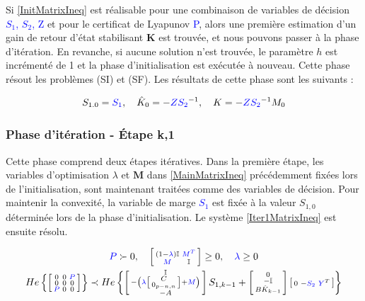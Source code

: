 Si \eqref{InitMatrixIneq} est réalisable pour une combinaison de variables de décision \textcolor{blue}{$S_1$, $S_2$, Z} et pour le certificat de Lyapunov \textcolor{blue}{P}, alors une première estimation d'un gain de retour d'état stabilisant $\boldsymbol{K}$ est trouvée, et nous pouvons passer à la phase d'itération. En revanche, si aucune solution n'est trouvée, le paramètre $h$ est incrémenté de 1 et la phase d'initialisation est exécutée à nouveau. Cette phase résout les problèmes (SI) et (SF). Les résultats de cette phase sont les suivants :

\begin{equation}
    \begin{gathered}
        S_{1.0}=\textcolor{blue}{S_1},  \quad
        \hat{K}_0 = -\textcolor{blue}{Z} \textcolor{blue}{S_2}^{-1}, \quad
        K = -\textcolor{blue}{Z} \textcolor{blue}{S_2}^{-1} M_0
    \end{gathered}
    \label{OutputsInit}
\end{equation}

\subsubsection{Phase d'itération - Étape k,1}

Cette phase comprend deux étapes itératives. Dans la première étape, les variables d'optimisation $\lambda$ et $\boldsymbol{M}$ dans \ref{MainMatrixIneq} précédemment fixées lors de l'initialisation, sont maintenant traitées comme des variables de décision. Pour maintenir la convexité, la variable de marge \textcolor{blue}{$S_1$} est fixée à la valeur $S_{1,0}$ déterminée lors de la phase d'initialisation. Le système \eqref{Iter1MatrixIneq} est ensuite résolu.

\begin{equation}
\centering
    \begin{gathered}
        \textcolor{blue}{P} \succ 0, \quad \smallmat{
            (1-\textcolor{blue}{\lambda})\mathbb{I} & \textcolor{blue}{M^T}\\
            \textcolor{blue}{M} & \mathbb{I}
        } \geq 0 ,\quad \textcolor{blue}{\lambda} \geq 0 \\
        He\left\{ \smallmat{
            0 & 0 & \textcolor{blue}{P}\\
            0 & 0 & 0\\
            \textcolor{blue}{P} & 0 & 0
        }\right\}
    \prec
    He\left\{\smallmat{
            \mathbb{I}\\
            -\left( \textcolor{blue}{\lambda}
            \smallmat{
                C\\
                0_{p-n,n}
             } +
            \textcolor{blue}{M}
            \right) \\
            -A
    }
    S_{1,k-1} +
    \smallmat{
         0\\
        -\mathbb{I}\\
        B \hat{K}_{k-1}
    }
    \smallmat{
        0 & -\textcolor{blue}{S_2} & \textcolor{blue}{Y}^T
    }\right\}
    \end{gathered}
    \label{Iter1MatrixIneq}
\end{equation}

